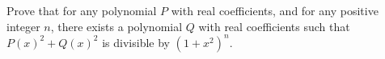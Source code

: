 Prove that for any polynomial $P$ with real coefficients, and for any positive integer $n$, there exists a polynomial $Q$ with real coefficients such that $P(x)^2 +Q(x)^2$ is divisible by $(1+x^2)^n$.